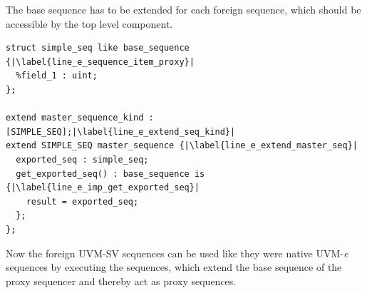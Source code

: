 The base sequence has to be extended for each foreign sequence, which should be accessible by the top level component.
\lstset{language=e, numbers = left, escapechar=|, breaklines=true}
\begin{lstlisting}[frame=htrbl, caption={\textit{e}: exporting the foreign UVM-SV sequence},
label={lst:e_exporting_sequence}]
struct simple_seq like base_sequence {|\label{line_e_sequence_item_proxy}|
  %field_1 : uint;
};

extend master_sequence_kind : [SIMPLE_SEQ];|\label{line_e_extend_seq_kind}|
extend SIMPLE_SEQ master_sequence {|\label{line_e_extend_master_seq}|
  exported_seq : simple_seq;
  get_exported_seq() : base_sequence is {|\label{line_e_imp_get_exported_seq}|
    result = exported_seq;
  };
};
\end{lstlisting}
Now the foreign UVM-SV sequences can be used like they were native UVM-\textit{e} sequences by executing the sequences, which extend the base sequence of the proxy sequencer and thereby act as proxy sequences.
